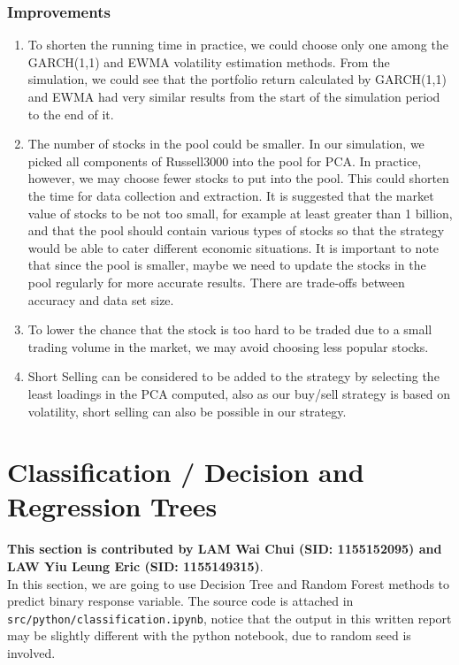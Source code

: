 \documentclass[11pt,a4paper]{article}
\begin{document}
    
    \subsubsection{Improvements}
    \begin{enumerate}
    \item To shorten the running time in practice, we could choose only one among the GARCH(1,1) and EWMA volatility estimation methods. From the simulation, we could see that the portfolio return calculated by GARCH(1,1) and EWMA had very similar results from the start of the simulation period to the end of it.
    
    \item The number of stocks in the pool could be smaller. In our simulation, we picked all components of Russell3000 into the pool for PCA. In practice, however, we may choose fewer stocks to put into the pool. This could shorten the time for data collection and extraction. It is suggested that the market value of stocks to be not too small, for example at least greater than 1 billion, and that the pool should contain various types of stocks so that the strategy would be able to cater different economic situations. It is important to note that since the pool is smaller, maybe we need to update the stocks in the pool regularly for more accurate results. There are trade-offs between accuracy and data set size.
    
    \item To lower the chance that the stock is too hard to be traded due to a small trading volume in the market, we may avoid choosing less popular stocks.
    
    \item Short Selling can be considered to be added to the strategy by selecting the least loadings in the PCA computed, also as our buy/sell strategy is based on volatility, short selling can also be possible in our strategy.
    \end{enumerate}
    
    
    \newpage
    \section{Classification / Decision and Regression Trees}
    \textbf{This section is contributed by LAM Wai Chui (SID: 1155152095) and LAW Yiu Leung Eric (SID: 1155149315)}. \\
    In this section, we are going to use Decision Tree and Random Forest methods to predict binary response variable. The source code is attached in \texttt{src/python/classification.ipynb}, notice that the output in this written report may be slightly different with the python notebook, due to random seed is involved.
    
\end{document}

